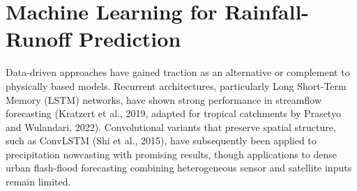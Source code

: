 \section{Machine Learning for Rainfall-Runoff Prediction}
Data-driven approaches have gained traction as an alternative or complement to physically based models. Recurrent architectures, particularly Long Short-Term Memory (LSTM) networks, have shown strong performance in streamflow forecasting (Kratzert et al., 2019, adapted for tropical catchments by Prasetyo and Wulandari, 2022). Convolutional variants that preserve spatial structure, such as ConvLSTM (Shi et al., 2015), have subsequently been applied to precipitation nowcasting with promising results, though applications to dense urban flash-flood forecasting combining heterogeneous sensor and satellite inputs remain limited.
